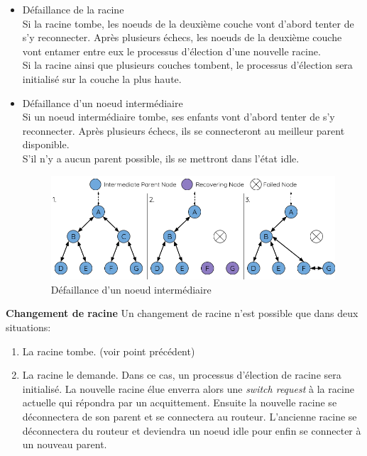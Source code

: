             \begin{itemize}
                \item Défaillance de la racine\\
                    Si la racine tombe, les noeuds de la deuxième couche vont d'abord tenter de s'y reconnecter.
                    Après plusieurs échecs, les noeuds de la deuxième couche vont entamer entre eux le processus d'élection d'une nouvelle racine.\\
                    Si la racine ainsi que plusieurs couches tombent, le processus d'élection sera initialisé sur la couche la plus haute.


                \item Défaillance d'un noeud intermédiaire\\
                    Si un noeud intermédiaire tombe, ses enfants vont d'abord tenter de s'y reconnecter.
                    Après plusieurs échecs, ils se connecteront au meilleur parent disponible.\\
                    S'il n'y a aucun parent possible, ils se mettront dans l'état idle.
                    \begin{figure}[H]
                        \centering
                        \includegraphics[scale=0.5]{images/mesh-parent-node-failure.png}
                        \caption{Défaillance d'un noeud intermédiaire\cite{esp-mesh_w}}
                    \end{figure}
            \end{itemize}
            \vspace{0.5cm}
            \textbf{Changement de racine}\newline
                Un changement de racine n'est possible que dans deux situations:
                \begin{enumerate}
                    \item La racine tombe. (voir point précédent)
                    \item La racine le demande.
                        Dans ce cas, un processus d'élection de racine sera initialisé. La nouvelle racine élue
                        enverra alors une \textit{switch request} à la racine actuelle qui répondra par un acquittement.
                        Ensuite la nouvelle racine se déconnectera de son parent et se connectera au routeur.
                        L'ancienne racine se déconnectera du routeur et deviendra un noeud idle pour enfin se connecter à un nouveau parent.
                \end{enumerate}
